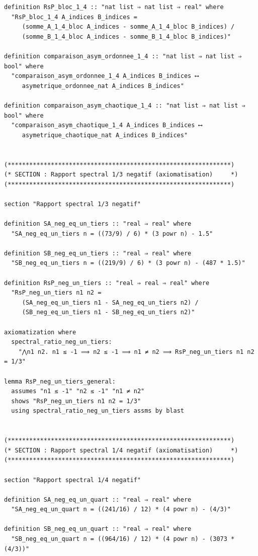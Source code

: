 \documentclass[a4paper,11pt]{article}
\begin{document}
\begin{holcode}[title={\textcolor{white}{File: methode\_spectral.thy -- Part 5/6}}]
\begin{lstlisting}
definition RsP_bloc_1_4 :: "nat list ⇒ nat list ⇒ real" where
  "RsP_bloc_1_4 A_indices B_indices =
     (somme_A_1_4_bloc A_indices - somme_A_1_4_bloc B_indices) /
     (somme_B_1_4_bloc A_indices - somme_B_1_4_bloc B_indices)"

definition comparaison_asym_ordonnee_1_4 :: "nat list ⇒ nat list ⇒ bool" where
  "comparaison_asym_ordonnee_1_4 A_indices B_indices ⟷
     asymetrique_ordonnee_nat A_indices B_indices"

definition comparaison_asym_chaotique_1_4 :: "nat list ⇒ nat list ⇒ bool" where
  "comparaison_asym_chaotique_1_4 A_indices B_indices ⟷
     asymetrique_chaotique_nat A_indices B_indices"


(**************************************************************)
(* SECTION : Rapport spectral 1/3 negatif (axiomatisation)     *)
(**************************************************************)

section "Rapport spectral 1/3 negatif"

definition SA_neg_eq_un_tiers :: "real ⇒ real" where
  "SA_neg_eq_un_tiers n = ((73/9) / 6) * (3 powr n) - 1.5"

definition SB_neg_eq_un_tiers :: "real ⇒ real" where
  "SB_neg_eq_un_tiers n = ((219/9) / 6) * (3 powr n) - (487 * 1.5)"

definition RsP_neg_un_tiers :: "real ⇒ real ⇒ real" where
  "RsP_neg_un_tiers n1 n2 =
     (SA_neg_eq_un_tiers n1 - SA_neg_eq_un_tiers n2) /
     (SB_neg_eq_un_tiers n1 - SB_neg_eq_un_tiers n2)"

axiomatization where
  spectral_ratio_neg_un_tiers:
    "⋀n1 n2. n1 ≤ -1 ⟹ n2 ≤ -1 ⟹ n1 ≠ n2 ⟹ RsP_neg_un_tiers n1 n2 = 1/3"

lemma RsP_neg_un_tiers_general:
  assumes "n1 ≤ -1" "n2 ≤ -1" "n1 ≠ n2"
  shows "RsP_neg_un_tiers n1 n2 = 1/3"
  using spectral_ratio_neg_un_tiers assms by blast


(**************************************************************)
(* SECTION : Rapport spectral 1/4 negatif (axiomatisation)     *)
(**************************************************************)

section "Rapport spectral 1/4 negatif"

definition SA_neg_eq_un_quart :: "real ⇒ real" where
  "SA_neg_eq_un_quart n = ((241/16) / 12) * (4 powr n) - (4/3)"

definition SB_neg_eq_un_quart :: "real ⇒ real" where
  "SB_neg_eq_un_quart n = ((964/16) / 12) * (4 powr n) - (3073 * (4/3))"


\end{lstlisting}
\end{holcode}
\end{document}
